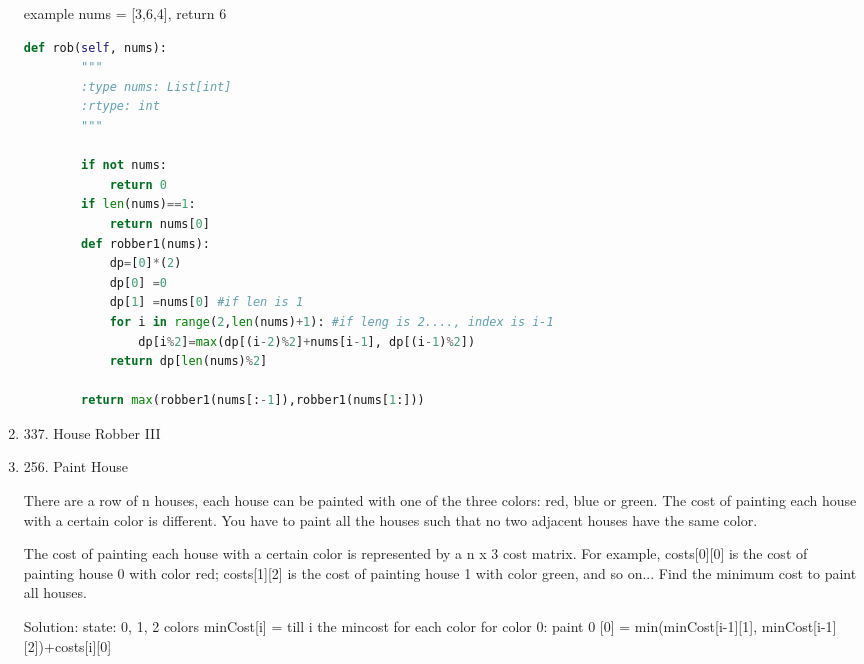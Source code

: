 \documentclass[../main.tex]{subfiles}
\begin{document}
\begin{enumerate}
example
 nums = [3,6,4], return 6










\begin{lstlisting}[language = Python]
def rob(self, nums):
        """
        :type nums: List[int]
        :rtype: int
        """
        
        if not nums:
            return 0
        if len(nums)==1:
            return nums[0]
        def robber1(nums):
            dp=[0]*(2)
            dp[0] =0
            dp[1] =nums[0] #if len is 1
            for i in range(2,len(nums)+1): #if leng is 2...., index is i-1
                dp[i%2]=max(dp[(i-2)%2]+nums[i-1], dp[(i-1)%2])
            return dp[len(nums)%2]
        
        return max(robber1(nums[:-1]),robber1(nums[1:]))
\end{lstlisting}

\item 337. House Robber III

\item 256. Paint House

There are a row of n houses, each house can be painted with one of the three colors: red, blue or green. The cost of painting each house with a certain color is different. You have to paint all the houses such that no two adjacent houses have the same color.

The cost of painting each house with a certain color is represented by a n x 3 cost matrix. For example, costs[0][0] is the cost of painting house 0 with color red; costs[1][2] is the cost of painting house 1 with color green, and so on... Find the minimum cost to paint all houses.

Solution: state: 0, 1, 2 colors
minCost[i] = till i the mincost for each color
for color 0: paint 0 [0] = min(minCost[i-1][1], minCost[i-1][2])+costs[i][0]


\end{enumerate}
\end{document}
